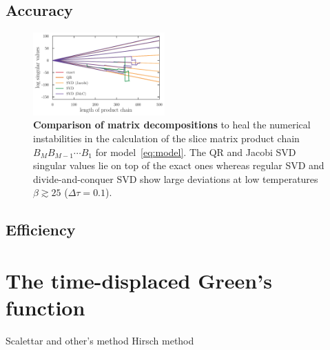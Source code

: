 \documentclass[%
 reprint,
superscriptaddress,
showpacs,
 amsmath,amssymb,
 aps,
 prb,
longbibliography,
]{revtex4-1}
\begin{document}
\subsection{Accuracy}

\begin{figure}[h]
	\includegraphics[width=0.45\textwidth]{../notebooks/decomp_comparison_simple.pdf}
	\caption{\textbf{Comparison of matrix decompositions} to heal the numerical instabilities in the calculation of the slice matrix product chain $B_M B_{M-1} \cdots B_1$ for model~\eqref{eq:model}. The QR and Jacobi SVD singular values lie on top of the exact ones whereas regular SVD and divide-and-conquer SVD show large deviations at low temperatures $\beta \gtrsim 25$ ($\Delta \tau = 0.1$). \label{fig:decomp_comparison_simple}}
\end{figure}




\subsection{Efficiency}



\section{The time-displaced Green's function}
Scalettar and other's method \cite{Loh2005}
Hirsch method\cite{Hirsch1988}








\clearpage

\end{document}
